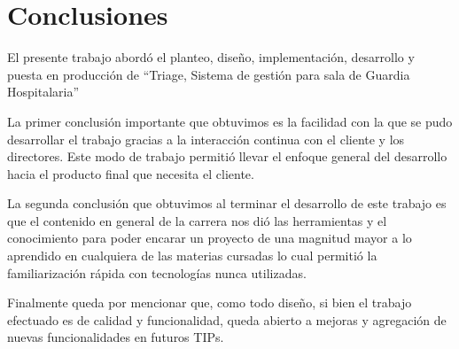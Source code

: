 \section{Conclusiones}


El presente trabajo abordó el planteo, diseño, implementación, desarrollo y puesta en producción de ``Triage, Sistema de gestión para 
sala de Guardia Hospitalaria''

La primer conclusión importante que obtuvimos es la facilidad con la que se pudo desarrollar el trabajo gracias a la interacción continua con el cliente y los directores. Este modo de trabajo permitió llevar el enfoque general del desarrollo hacia el producto final que necesita el cliente. 

La segunda conclusión que obtuvimos al terminar el desarrollo de este trabajo es que el contenido en general de la carrera nos dió las herramientas y el conocimiento para poder encarar un proyecto de una magnitud mayor a lo aprendido en cualquiera de las materias cursadas lo cual permitió la familiarización rápida con tecnologías nunca utilizadas.

Finalmente queda por mencionar que, como todo diseño, si bien el trabajo efectuado es de calidad y funcionalidad, queda abierto a mejoras y agregación de nuevas funcionalidades en futuros TIPs.

